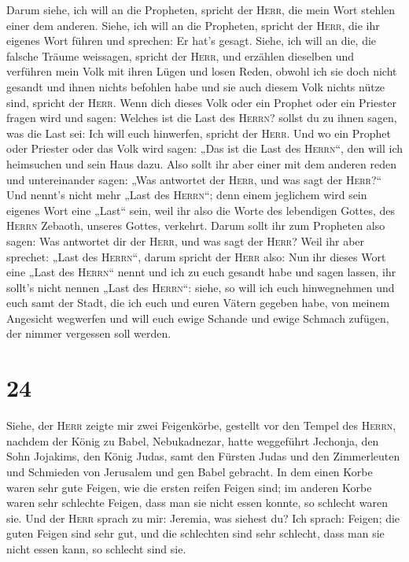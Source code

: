  Darum siehe, ich will an die Propheten, spricht der
\textsc{Herr}, die mein Wort stehlen einer dem anderen. 
Siehe, ich will an die Propheten, spricht der \textsc{Herr}, die ihr
eigenes Wort führen und sprechen: Er hat's gesagt. 
Siehe, ich will an die, die falsche Träume weissagen, spricht der
\textsc{Herr}, und erzählen dieselben und verführen mein Volk mit ihren
Lügen und losen Reden, obwohl ich sie doch nicht gesandt und ihnen
nichts befohlen habe und sie auch diesem Volk nichts nütze sind, spricht
der \textsc{Herr}.  Wenn dich dieses Volk oder ein
Prophet oder ein Priester fragen wird und sagen: Welches ist die Last
des \textsc{Herrn}? sollst du zu ihnen sagen, was die Last sei: Ich will
euch hinwerfen, spricht der \textsc{Herr}.  Und wo ein
Prophet oder Priester oder das Volk wird sagen: „Das ist die Last des
\textsc{Herrn}``, den will ich heimsuchen und sein Haus dazu.
 Also sollt ihr aber einer mit dem anderen reden und
untereinander sagen: „Was antwortet der \textsc{Herr}, und was sagt der
\textsc{Herr}?{}``  Und nennt's nicht mehr „Last des
\textsc{Herrn}``; denn einem jeglichem wird sein eigenes Wort eine
„Last`` sein, weil ihr also die Worte des lebendigen Gottes, des
\textsc{Herrn} Zebaoth, unseres Gottes, verkehrt.  Darum
sollt ihr zum Propheten also sagen: Was antwortet dir der \textsc{Herr},
und was sagt der \textsc{Herr}?  Weil ihr aber sprechet:
„Last des \textsc{Herrn}``, darum spricht der \textsc{Herr} also: Nun
ihr dieses Wort eine „Last des \textsc{Herrn}`` nennt und ich zu euch
gesandt habe und sagen lassen, ihr sollt's nicht nennen „Last des
\textsc{Herrn}``:  siehe, so will ich euch hinwegnehmen
und euch samt der Stadt, die ich euch und euren Vätern gegeben habe, von
meinem Angesicht wegwerfen  und will euch ewige Schande
und ewige Schmach zufügen, der nimmer vergessen soll werden.

\hypertarget{section-23}{%
\section{24}\label{section-23}}

 Siehe, der \textsc{Herr} zeigte mir zwei Feigenkörbe,
gestellt vor den Tempel des \textsc{Herrn}, nachdem der König zu Babel,
Nebukadnezar, hatte weggeführt Jechonja, den Sohn Jojakims, den König
Judas, samt den Fürsten Judas und den Zimmerleuten und Schmieden von
Jerusalem und gen Babel gebracht.  In dem einen Korbe
waren sehr gute Feigen, wie die ersten reifen Feigen sind; im anderen
Korbe waren sehr schlechte Feigen, dass man sie nicht essen konnte, so
schlecht waren sie.  Und der \textsc{Herr} sprach zu mir:
Jeremia, was siehest du? Ich sprach: Feigen; die guten Feigen sind sehr
gut, und die schlechten sind sehr schlecht, dass man sie nicht essen
kann, so schlecht sind sie.


